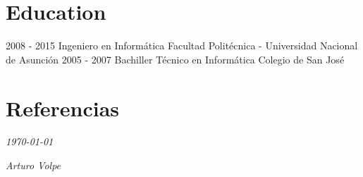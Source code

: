 \documentclass[]{friggeri-cv}
\begin{document}
\section{Education}
\begin{entrylist}
  \entry
    {2008 - 2015}
    {Ingeniero en Informática}
    {Facultad Politécnica - Universidad Nacional de Asunción}
    {}
  \entry
    {2005 - 2007}
    {Bachiller Técnico en Informática}
    {Colegio de San José}
    {}
\end{entrylist}

\section{Referencias}
\begin{entrylist}
\end{entrylist}

\begin{flushleft}
    \emph{\today{}}
\end{flushleft}
\begin{flushright}
    \emph{Arturo Volpe}
\end{flushright}
\end{document}
